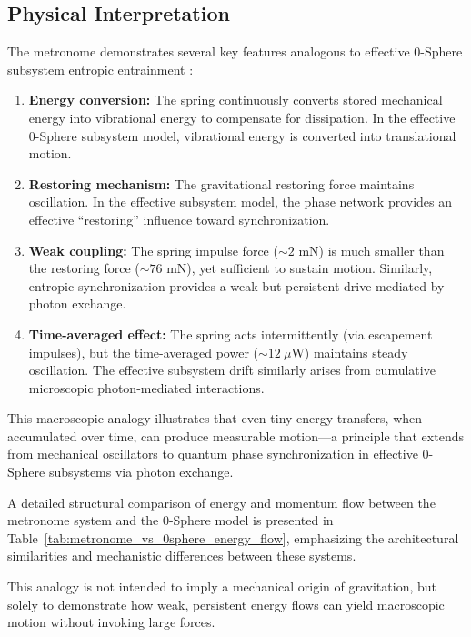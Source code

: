 \documentclass[
 reprint,
 amsmath,amssymb,
 aps,
 prb,
]{revtex4-2}
\numberwithin{equation}{section}
\begin{document}
\subsection{Physical Interpretation}
\label{app:interpretation}

The metronome demonstrates several key features analogous to effective 0-Sphere subsystem entropic entrainment \cite{Bennett2002,Pikovsky2001}:

\begin{enumerate}
\item \textbf{Energy conversion:} The spring continuously converts stored mechanical energy into vibrational energy to compensate for dissipation. In the effective 0-Sphere subsystem model, vibrational energy is converted into translational motion.

\item \textbf{Restoring mechanism:} The gravitational restoring force maintains oscillation. In the effective subsystem model, the phase network provides an effective ``restoring'' influence toward synchronization.

\item \textbf{Weak coupling:} The spring impulse force ($\sim 2$ mN) is much smaller than the restoring force ($\sim 76$ mN), yet sufficient to sustain motion. Similarly, entropic synchronization provides a weak but persistent drive mediated by photon exchange.

\item \textbf{Time-averaged effect:} The spring acts intermittently (via escapement impulses), but the time-averaged power ($\sim 12~\mu$W) maintains steady oscillation. The effective subsystem drift similarly arises from cumulative microscopic photon-mediated interactions.
\end{enumerate}

This macroscopic analogy illustrates that even tiny energy transfers, when accumulated over time, can produce measurable motion—a principle that extends from mechanical oscillators to quantum phase synchronization in effective 0-Sphere subsystems via photon exchange.

A detailed structural comparison of energy and momentum flow between the metronome system and the 0-Sphere model is presented in Table~\ref{tab:metronome_vs_0sphere_energy_flow}, emphasizing the architectural similarities and mechanistic differences between these systems.

This analogy is not intended to imply a mechanical origin of gravitation, but solely to demonstrate how weak, persistent energy flows can yield macroscopic motion without invoking large forces.
\end{document}
